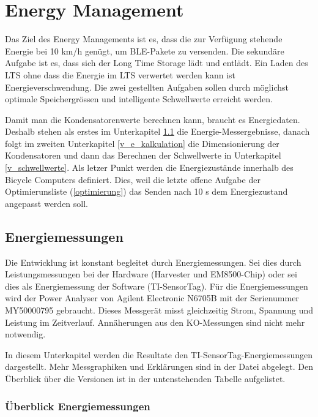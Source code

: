 \section{Energy Management}

Das Ziel des Energy Managements ist es, dass die zur Verfügung stehende Energie bei 10 km/h genügt, um BLE-Pakete zu versenden. Die sekundäre Aufgabe ist es, dass sich der Long Time Storage lädt und entlädt. Ein Laden des LTS ohne dass die Energie im LTS verwertet werden kann ist Energieverschwendung. Die zwei gestellten Aufgaben sollen durch möglichst optimale Speichergrössen und intelligente Schwellwerte erreicht werden.

Damit man die Kondensatorenwerte berechnen kann, braucht es Energiedaten. Deshalb stehen als erstes im Unterkapitel \ref{v_messungen_sensortag} die Energie-Messergebnisse, danach folgt im zweiten Unterkapitel \ref{v_e_kalkulation} die Dimensionierung der Kondensatoren und dann das Berechnen der Schwellwerte in Unterkapitel \ref{v_schwellwerte}. Als letzer Punkt werden die Energiezustände innerhalb des Bicycle Computers definiert. Dies, weil die letzte offene Aufgabe der Optimierunsliste (\ref{optimierung}) das Senden nach 10 s dem Energiezustand angepasst werden soll.


\subsection{Energiemessungen}
\label{v_messungen_sensortag}


Die Entwicklung ist konstant begleitet durch Energiemessungen. Sei dies durch Leistungsmessungen bei der Hardware (Harvester und EM8500-Chip) oder sei dies als Energiemessung der Software (TI-SensorTag). Für die Energiemessungen wird der Power Analyser von Agilent Electronic N6705B mit der Serienummer MY50000795 gebraucht. Dieses Messgerät misst gleichzeitig Strom, Spannung und Leistung im Zeitverlauf. Annäherungen aus den KO-Messungen sind nicht mehr notwendig.

In diesem Unterkapitel werden die Resultate den TI-SensorTag-Energiemessungen dargestellt. Mehr Messgraphiken und Erklärungen sind in der Datei  abgelegt. Den Überblick über die Versionen ist in der untenstehenden Tabelle aufgelistet. 


\subsubsection{Überblick Energiemessungen}
\label{erst_EMessungen}

